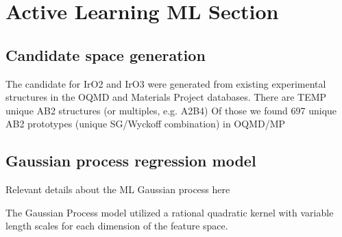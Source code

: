 

\section{Active Learning ML Section}  %
%

\subsection{Candidate space generation}
The candidate for IrO2 and IrO3 were generated from existing experimental structures in the OQMD and Materials Project databases.
%
There are TEMP unique AB2 structures (or multiples, e.g. A2B4)
%
Of those we found 697 unique AB2 prototypes (unique SG/Wyckoff combination) in OQMD/MP
%



\subsection{Gaussian process regression model}
Relevant details about the ML Gaussian process here  %

The Gaussian Process model utilized a rational quadratic kernel with variable length scales for each dimension of the feature space.

